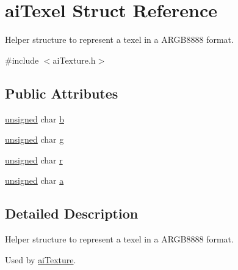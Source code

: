 \hypertarget{structai_texel}{\section{ai\-Texel Struct Reference}
\label{structai_texel}
}


Helper structure to represent a texel in a A\-R\-G\-B8888 format.  




{\ttfamily \#include $<$ai\-Texture.\-h$>$}

\subsection*{Public Attributes}
\begin{DoxyCompactItemize}
\item 
\hyperlink{_free_image_8h_a425076c7067a1b5166e2cc530e914814}{unsigned} char \hyperlink{structai_texel_a5b4f97f69cf59cb9065af67389599ba6}{b}
\item 
\hyperlink{_free_image_8h_a425076c7067a1b5166e2cc530e914814}{unsigned} char \hyperlink{structai_texel_a41da3516b8241165e4ca58ea8ed68fe6}{g}
\item 
\hyperlink{_free_image_8h_a425076c7067a1b5166e2cc530e914814}{unsigned} char \hyperlink{structai_texel_ae9408c0d18f6ff597715cc626398a0ff}{r}
\item 
\hyperlink{_free_image_8h_a425076c7067a1b5166e2cc530e914814}{unsigned} char \hyperlink{structai_texel_a6d4450e83b02b29d24f7aab27958034e}{a}
\end{DoxyCompactItemize}


\subsection{Detailed Description}
Helper structure to represent a texel in a A\-R\-G\-B8888 format. 

Used by \hyperlink{structai_texture}{ai\-Texture}. 

